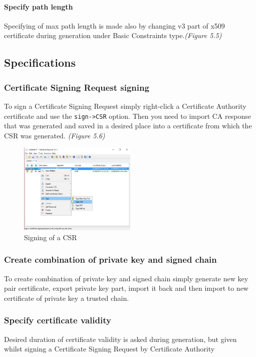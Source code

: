 \documentclass[10pt, a4paper]{report}
\begin{document}
{      \paragraph{Specify path length}
Specifying of max path length is made also by changing v3 part of x509 certificate during generation under Basic Constraints type.\textit{(Figure 5.5)}

  \subsection{Specifications}
  
    \subsubsection{Certificate Signing Request signing}
To sign a Certificate Signing Request simply right-click a Certificate Authority certificate and use the \verb+sign->CSR+ option. Then you need to import CA response that was generated and saved in a desired place into a certificate from which the CSR was generated. \textit{(Figure 5.6)}

\begin{figure}[!ht]
 \caption{Signing of a CSR}
 \centering
  \includegraphics[width=0.5\textwidth]{../Dependancies/Keystore_Explorer/CSRsign.jpg}
\end{figure}

    \subsubsection{Create combination of private key and signed chain}
To create combination of private key and signed chain simply generate new key pair certificate, export private key part, import it back and then import to new certificate of private key a trusted chain.

    \subsubsection{Specify certificate validity}
Desired duration of certificate validity is asked during generation, but given whilst signing a Certificate Signing Request by Certificate Authority

}
\end{document}
